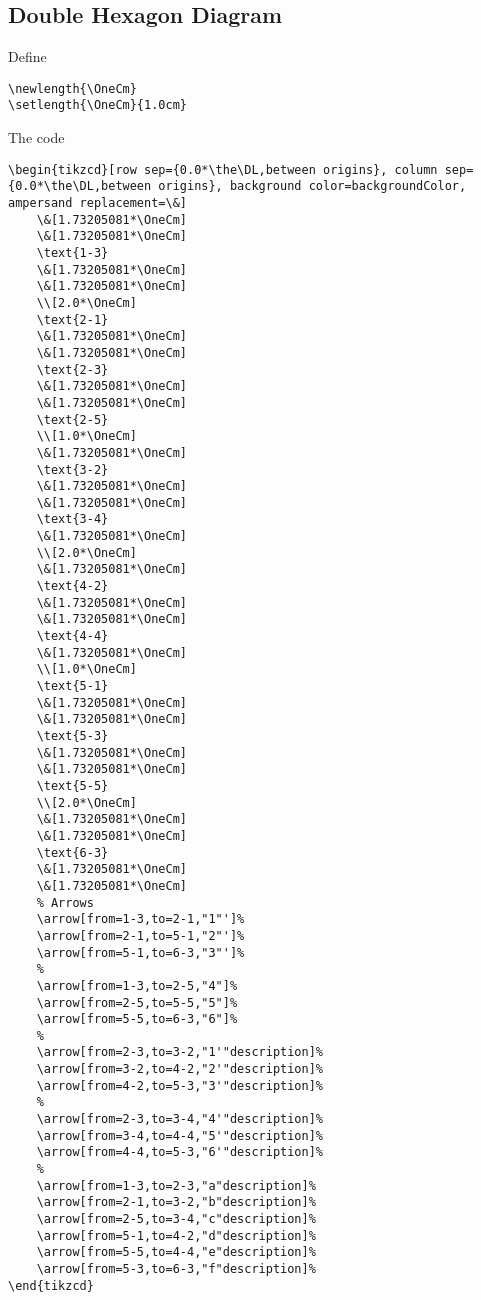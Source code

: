 \subsection{Double Hexagon Diagram}\label{subsection-tikz-code-for-commutative-diagrams-double-hexagon-diagram}
Define
\begin{verbatim}
\newlength{\OneCm}
\setlength{\OneCm}{1.0cm}
\end{verbatim}
The code
\begin{verbatim}
\begin{tikzcd}[row sep={0.0*\the\DL,between origins}, column sep={0.0*\the\DL,between origins}, background color=backgroundColor, ampersand replacement=\&]
    \&[1.73205081*\OneCm]
    \&[1.73205081*\OneCm]
    \text{1-3}
    \&[1.73205081*\OneCm]
    \&[1.73205081*\OneCm]
    \\[2.0*\OneCm]
    \text{2-1}
    \&[1.73205081*\OneCm]
    \&[1.73205081*\OneCm]
    \text{2-3}
    \&[1.73205081*\OneCm]
    \&[1.73205081*\OneCm]
    \text{2-5}
    \\[1.0*\OneCm]
    \&[1.73205081*\OneCm]
    \text{3-2}
    \&[1.73205081*\OneCm]
    \&[1.73205081*\OneCm]
    \text{3-4}
    \&[1.73205081*\OneCm]
    \\[2.0*\OneCm]
    \&[1.73205081*\OneCm]
    \text{4-2}
    \&[1.73205081*\OneCm]
    \&[1.73205081*\OneCm]
    \text{4-4}
    \&[1.73205081*\OneCm]
    \\[1.0*\OneCm]
    \text{5-1}
    \&[1.73205081*\OneCm]
    \&[1.73205081*\OneCm]
    \text{5-3}
    \&[1.73205081*\OneCm]
    \&[1.73205081*\OneCm]
    \text{5-5}
    \\[2.0*\OneCm]
    \&[1.73205081*\OneCm]
    \&[1.73205081*\OneCm]
    \text{6-3}
    \&[1.73205081*\OneCm]
    \&[1.73205081*\OneCm]
    % Arrows
    \arrow[from=1-3,to=2-1,"1"']%
    \arrow[from=2-1,to=5-1,"2"']%
    \arrow[from=5-1,to=6-3,"3"']%
    %
    \arrow[from=1-3,to=2-5,"4"]%
    \arrow[from=2-5,to=5-5,"5"]%
    \arrow[from=5-5,to=6-3,"6"]%
    %
    \arrow[from=2-3,to=3-2,"1'"description]%
    \arrow[from=3-2,to=4-2,"2'"description]%
    \arrow[from=4-2,to=5-3,"3'"description]%
    %
    \arrow[from=2-3,to=3-4,"4'"description]%
    \arrow[from=3-4,to=4-4,"5'"description]%
    \arrow[from=4-4,to=5-3,"6'"description]%
    %
    \arrow[from=1-3,to=2-3,"a"description]%
    \arrow[from=2-1,to=3-2,"b"description]%
    \arrow[from=2-5,to=3-4,"c"description]%
    \arrow[from=5-1,to=4-2,"d"description]%
    \arrow[from=5-5,to=4-4,"e"description]%
    \arrow[from=5-3,to=6-3,"f"description]%
\end{tikzcd}
\end{verbatim}
